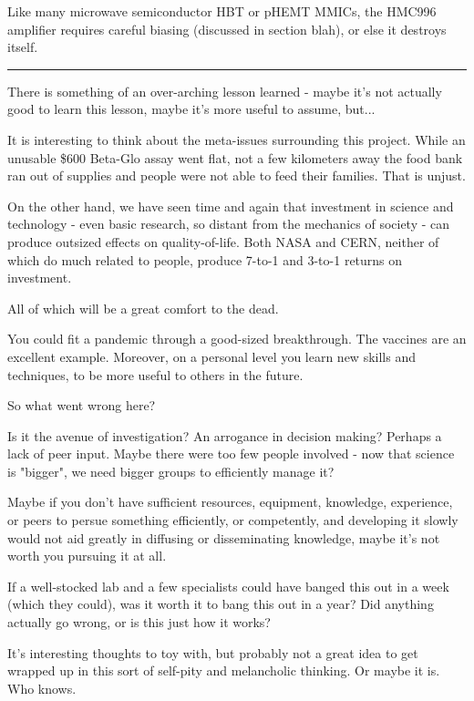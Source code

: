 \documentclass[paper.tex]{subfiles}
\begin{document}
Like many microwave semiconductor HBT or pHEMT MMICs, the HMC996 amplifier requires careful biasing (discussed in section blah), or else it destroys itself. 






\rule{\linewidth}{0.2pt}


There is something of an over-arching lesson learned - maybe it's not actually good to learn this lesson, maybe it's more useful to assume, but...

It is interesting to think about the meta-issues surrounding this project. While an unusable \$600 Beta-Glo assay went flat, not a few kilometers away the food bank ran out of supplies and people were not able to feed their families. That is unjust. 

On the other hand, we have seen time and again that investment in science and technology - even basic research, so distant from the mechanics of society - can produce outsized effects on quality-of-life. Both NASA and CERN, neither of which do much related to people, produce 7-to-1 and 3-to-1 returns on investment. 

All of which will be a great comfort to the dead. 

You could fit a pandemic through a good-sized breakthrough. The vaccines are an excellent example. Moreover, on a personal level you learn new skills and techniques, to be more useful to others in the future.

So what went wrong here? 

Is it the avenue of investigation? An arrogance in decision making? Perhaps a lack of peer input. Maybe there were too few people involved - now that science is "bigger", we need bigger groups to efficiently manage it? 

Maybe if you don't have sufficient resources, equipment, knowledge, experience, or peers to persue something efficiently, or competently, and developing it slowly would not aid greatly in diffusing or disseminating knowledge, maybe it's not worth you pursuing it at all.

If a well-stocked lab and a few specialists could have banged this out in a week (which they could), was it worth it to bang this out in a year? Did anything actually go wrong, or is this just how it works?

It's interesting thoughts to toy with, but probably not a great idea to get wrapped up in this sort of self-pity and melancholic thinking. Or maybe it is. Who knows.
\end{document}
